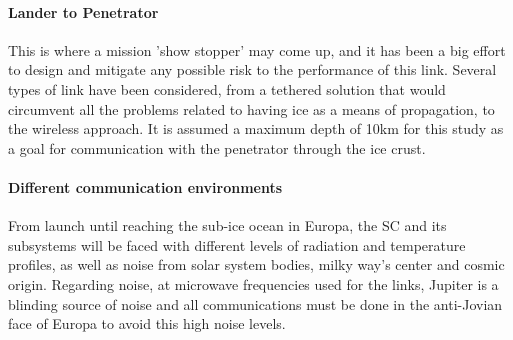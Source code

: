 \paragraph{Lander to Penetrator}
This is where a mission 'show stopper' may come up, and it has been a big effort to design and mitigate any possible risk to the performance of this link. Several types of link have been considered, from a tethered solution that would circumvent all the problems related to having ice as a means of propagation, to the wireless approach. It is assumed a maximum depth of 10km for this study as a goal for communication with the penetrator through the ice crust.

\paragraph{Different communication environments}
From launch until reaching the sub-ice ocean in Europa, the SC and its subsystems will be faced with different levels of radiation and temperature profiles, as well as noise from solar system bodies, milky way's center and cosmic origin. Regarding noise, at microwave frequencies used for the links, Jupiter is a blinding source of noise and all communications must be done in the anti-Jovian face of Europa to avoid this high noise levels.


